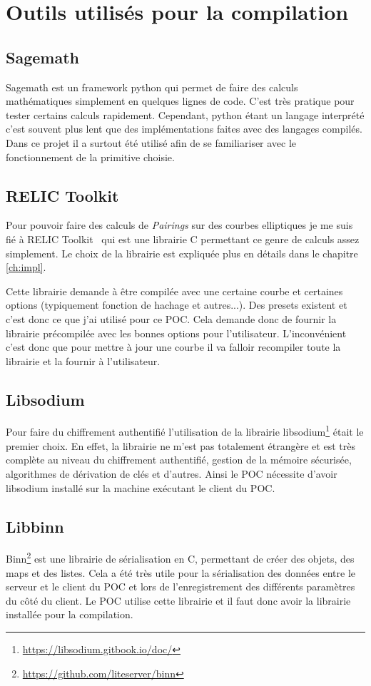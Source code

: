 \chapter{Outils utilisés pour la compilation}
\label{ch:outils}
\section{Sagemath}
Sagemath est un framework python qui permet de faire des calculs mathématiques simplement en quelques lignes de code. C'est très pratique pour tester certains calculs rapidement. Cependant, python étant un langage interprété c'est souvent plus lent que des implémentations faites avec des langages compilés. Dans ce projet il a surtout été utilisé afin de se familiariser avec le fonctionnement de la primitive choisie.

\section{RELIC Toolkit}
Pour pouvoir faire des calculs de \textit{Pairings} sur des courbes elliptiques je me suis fié à RELIC Toolkit~\cite{relic-toolkit} qui est une librairie C permettant ce genre de calculs assez simplement. Le choix de la librairie est expliquée plus en détails dans le chapitre \ref{ch:impl}.

Cette librairie demande à être compilée avec une certaine courbe et certaines options (typiquement fonction de hachage et autres...). Des presets existent et c'est donc ce que j'ai utilisé pour ce POC. Cela demande donc de fournir la librairie précompilée avec les bonnes options pour l'utilisateur. L'inconvénient c'est donc que pour mettre à jour une courbe il va falloir recompiler toute la librairie et la fournir à l'utilisateur.
\section{Libsodium}
Pour faire du chiffrement authentifié l'utilisation de la librairie  libsodium\footnote{\url{https://libsodium.gitbook.io/doc/}} était le premier choix. En effet, la librairie ne m'est pas totalement étrangère et est très complète au niveau du chiffrement authentifié, gestion de la mémoire sécurisée, algorithmes de dérivation de clés et d'autres. Ainsi le POC nécessite d'avoir libsodium installé sur la machine exécutant le client du POC.
\section{Libbinn}
Binn\footnote{\url{https://github.com/liteserver/binn}} est une librairie de sérialisation en C, permettant de créer des objets, des maps et des listes. Cela a été très utile pour la sérialisation des données entre le serveur et le client du POC et lors de l'enregistrement des différents paramètres du côté du client. Le POC utilise cette librairie et il faut donc avoir la librairie installée pour la compilation.
